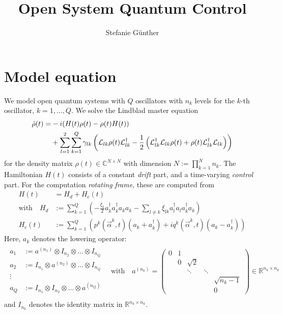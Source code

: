 \documentclass[letterpaper]{article}
\title{Open System Quantum Control}
\author{Stefanie G{\"u}nther}
\newcommand{\Ell}{\mathcal{L}}
\newcommand{\R}{\mathds{R}}
\newcommand{\C}{\mathds{C}}
\begin{document}
\maketitle

\section{Model equation}
We model open quantum systems with $Q$ oscillators with $n_k$ levels for the $k$-th oscillator, $k=1,\dots,Q$. We solve the Lindblad master equation
\begin{align}\label{mastereq}
  \dot \rho(t) = &-i(H(t)\rho(t) - \rho(t)H(t)) \notag \\
          &+ \sum_{l=1}^2 \sum_{k=1}^Q \gamma_{lk} \left( \Ell_{lk} \rho(t) \Ell_{lk}^{\dagger} - \frac 1 2 \left( \Ell_{lk}^{\dagger}\Ell_{lk} \rho(t) + \rho(t)\Ell_{lk}^{\dagger} \Ell_{lk}\right) \right)
\end{align}
for the density matrix $\rho(t)\in \C^{N\times N}$ with dimension $N := \prod_{k=1}^N n_k$. The Hamiltonian $H(t)$ consists of a constant \textit{drift} part, and a time-varying \textit{control} part. For the computation \textit{rotating frame}, these are computed from
\begin{align}
  H(t) &= H_d + H_c(t) \\
  \text{with} \quad H_d &:= \sum_{k=1}^Q \left(- \frac{\xi_k}{2} a_k^{\dagger}a_k^{\dagger}a_k a_k - \sum_{l\neq k} \xi_{lk} a_l^{\dagger}a_l a_k^{\dagger} a_k  \right) \\
                 H_c(t) &:= \sum_{k=1}^Q \left( p^k(\vec{\alpha}^k,t) (a_k + a_k^{\dagger}) + i q^k(\vec{\alpha}^k,t)(a_k - a_k^{\dagger})  \right)
\end{align}
Here, $a_k$ denotes the lowering operator:
\begin{align}
  \begin{array}{rl}
  a_1 &:= a^{(n_1)} \otimes I_{n_2} \otimes \dots \otimes I_{n_Q}\\
  a_2 &:= I_{n_1} \otimes a^{(n_2)} \otimes \dots \otimes I_{n_Q}\\
  \vdots \, & \\
  a_Q &:= I_{n_1} \otimes I_{n_2} \otimes \dots \otimes a^{(n_Q)}\\
  \end{array}
  \quad \text{with}\quad
 a^{(n_k)} = \begin{pmatrix}
   0 & 1 &          &         &    \\
     & 0 & \sqrt{2} &         &     \\
     &   & \ddots   & \ddots  &    \\
     &   &          &         & \sqrt{n_k-1}  \\
     &   &          &         & 0   
 \end{pmatrix} \in \R^{n_k \times n_k}
\end{align}
and $I_{n_k}$ denotes the identity matrix in $\R^{n_k \times n_k}$.
\end{document}
